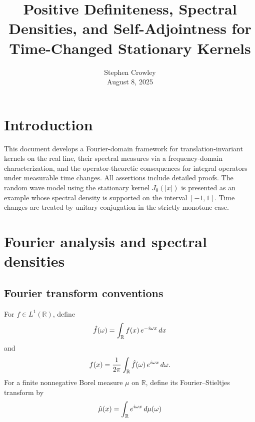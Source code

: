 \documentclass{article}
\newcommand{\tmaffiliation}[1]{\\ #1}
\begin{document}
\title{Positive Definiteness, Spectral Densities, and Self-Adjointness for
Time-Changed Stationary Kernels}

\author{
  Stephen Crowley
  \tmaffiliation{August 8, 2025}
}

\date{}

\maketitle

{\tableofcontents}

\section{Introduction}

This document develops a Fourier-domain framework for translation-invariant
kernels on the real line, their spectral measures via a frequency-domain
characterization, and the operator-theoretic consequences for integral
operators under measurable time changes. All assertions include detailed
proofs. The random wave model using the stationary kernel $J_0 (|x|)$ is
presented as an example whose spectral density is supported on the interval
$[- 1, 1]$. Time changes are treated by unitary conjugation in the strictly
monotone case.

\section{Fourier analysis and spectral densities}

\subsection{Fourier transform conventions}

For $f \in L^1 (\mathbb{R})$, define
\begin{equation}
  \hat{f} (\omega) = \int_{\mathbb{R}} f (x)  \hspace{0.17em} e^{- i \omega x}
  \hspace{0.17em} dx
\end{equation}
and
\begin{equation}
  f (x) = \frac{1}{2 \pi}  \int_{\mathbb{R}} \hat{f} (\omega)  \hspace{0.17em}
  e^{i \omega x}  \hspace{0.17em} d \omega .
\end{equation}
For a finite nonnegative Borel measure $\mu$ on $\mathbb{R}$, define its
Fourier--Stieltjes transform by
\begin{equation}
  \hat{\mu} (x) = \int_{\mathbb{R}} e^{i \omega x}  \hspace{0.17em} d \mu
  (\omega)
\end{equation}
\end{document}
